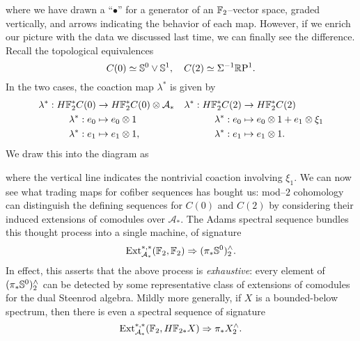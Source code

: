 where we have drawn a ``$\bullet$'' for a generator of an $\F_2$--vector space, graded vertically, and arrows indicating the behavior of each map.  However, if we enrich our picture with the data we discussed last time, we can finally see the difference.  Recall the topological equivalences \[C(0) \simeq \S^0 \vee \S^1, \quad C(2) \simeq \Susp^{-1} \RP^1.\]  In the two cases, the coaction map $\lambda^*$ is given by
\begin{align*}
\lambda^*: H\F_2^* C(0) & \to H\F_2^* C(0) \otimes \mathcal A_* & \lambda^*: H\F_2^* C(2) & \to H\F_2^* C(2) \\
\lambda^*: e_0 & \mapsto e_0 \otimes 1 & \lambda^*: e_0 & \mapsto e_0 \otimes 1 + e_1 \otimes \xi_1 \\
\lambda^*: e_1 & \mapsto e_1 \otimes 1, & \lambda^*: e_1 & \mapsto e_1 \otimes 1.
\end{align*}
We draw this into the diagram as
\begin{center}
\end{center}
where the vertical line indicates the nontrivial coaction involving $\xi_1$.  We can now see what trading maps for cofiber sequences has bought us: mod--$2$ cohomology can distinguish the defining sequences for $C(0)$ and $C(2)$ by considering their induced extensions of comodules over $\mathcal A_*$.  The Adams spectral sequence bundles this thought process into a single machine, of signature \[\Ext_{\mathcal A_*}^{*, *}(\F_2, \F_2) \Rightarrow (\pi_* \S^0)^\wedge_2.\]  In effect, this asserts that the above process is \emph{exhaustive}: every element of $(\pi_* \S^0)^\wedge_2$ can be detected by some representative class of extensions of comodules for the dual Steenrod algebra.  Mildly more generally, if $X$ is a bounded-below spectrum, then there is even a spectral sequence of signature \[\Ext_{\mathcal A_*}^{*, *}(\F_2, H\F_{2*} X) \Rightarrow \pi_* X^\wedge_2.\]

